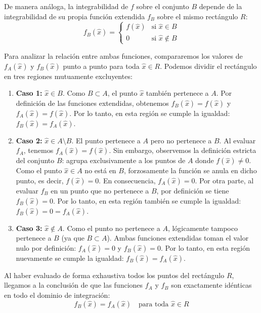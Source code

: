 \documentclass[11pt,letterpaper]{article}
\begin{document}
De manera análoga, la integrabilidad de $f$ sobre el conjunto $B$ depende de la integrabilidad de su propia función extendida $f_B$ sobre el mismo rectángulo $R$:
\begin{equation*}
f_B(\hat{x}) = 
\begin{cases} 
f(\hat{x}) & \text{si } \hat{x} \in B \\ 
0 & \text{si } \hat{x} \notin B 
\end{cases}
\end{equation*}

Para analizar la relación entre ambas funciones, compararemos los valores de $f_A(\hat{x})$ y $f_B(\hat{x})$ punto a punto para toda $\hat{x} \in R$. Podemos dividir el rectángulo en tres regiones mutuamente excluyentes:

\begin{enumerate}
    \item \textbf{Caso 1:} $\hat{x} \in B$. 
    Como $B \subset A$, el punto $\hat{x}$ también pertenece a $A$. Por definición de las funciones extendidas, obtenemos $f_B(\hat{x}) = f(\hat{x})$ y $f_A(\hat{x}) = f(\hat{x})$. 
    Por lo tanto, en esta región se cumple la igualdad: $f_B(\hat{x}) = f_A(\hat{x})$.

    \item \textbf{Caso 2:} $\hat{x} \in A \setminus B$. 
    El punto pertenece a $A$ pero no pertenece a $B$. Al evaluar $f_A$, tenemos $f_A(\hat{x}) = f(\hat{x})$. Sin embargo, observemos la definición estricta del conjunto $B$: agrupa exclusivamente a los puntos de $A$ donde $f(\hat{x}) \neq 0$. Como el punto $\hat{x} \in A$ no está en $B$, forzosamente la función se anula en dicho punto, es decir, $f(\hat{x}) = 0$. En consecuencia, $f_A(\hat{x}) = 0$. 
    Por otra parte, al evaluar $f_B$ en un punto que no pertenece a $B$, por definición se tiene $f_B(\hat{x}) = 0$. 
    Por lo tanto, en esta región también se cumple la igualdad: $f_B(\hat{x}) = 0 = f_A(\hat{x})$.

    \item \textbf{Caso 3:} $\hat{x} \notin A$. 
    Como el punto no pertenece a $A$, lógicamente tampoco pertenece a $B$ (ya que $B \subset A$). Ambas funciones extendidas toman el valor nulo por definición: $f_A(\hat{x}) = 0$ y $f_B(\hat{x}) = 0$.
    Por lo tanto, en esta región nuevamente se cumple la igualdad: $f_B(\hat{x}) = f_A(\hat{x})$.
\end{enumerate}

Al haber evaluado de forma exhaustiva todos los puntos del rectángulo $R$, llegamos a la conclusión de que las funciones $f_A$ y $f_B$ son exactamente idénticas en todo el dominio de integración:
\begin{equation*}
f_B(\hat{x}) = f_A(\hat{x}) \quad \text{para toda } \hat{x} \in R
\end{equation*}
\end{document}
